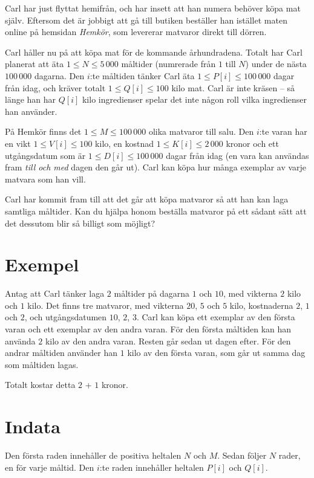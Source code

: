 Carl har just flyttat hemifrån, och har insett att han numera behöver köpa mat själv.
Eftersom det är jobbigt att gå till butiken beställer han istället maten online på hemsidan \emph{Hemkör}, som levererar matvaror direkt till dörren.

Carl håller nu på att köpa mat för de kommande århundradena.
Totalt har Carl planerat att äta $1 \le N \le 5\,000$ måltider (numrerade från $1$ till $N$) under de nästa $100\,000$ dagarna.
Den $i$:te måltiden tänker Carl äta $1 \le P[i] \le 100\,000$ dagar från idag, och kräver totalt $1 \le Q[i] \le 100$ kilo mat.
Carl är inte kräsen -- så länge han har $Q[i]$ kilo ingredienser spelar det inte någon roll vilka ingredienser han använder.

På Hemkör finns det $1 \le M \le 100\,000$ olika matvaror till salu.
Den $i$:te varan har en vikt $1 \le V[i] \le 100$ kilo, en kostnad $1 \le K[i] \le 2\,000$ kronor och ett utgångsdatum som är $1 \le D[i] \le 100\,000$ dagar från idag (en vara kan användas fram \emph{till och med} dagen den går ut).
Carl kan köpa hur många exemplar av varje matvara som han vill.

Carl har kommit fram till att det går att köpa matvaror så att han kan laga samtliga måltider.
Kan du hjälpa honom beställa matvaror på ett sådant sätt att det dessutom blir så billigt som möjligt?


\section*{Exempel}
Antag att Carl tänker laga $2$ måltider på dagarna $1$ och $10$, med vikterna $2$ kilo och $1$ kilo.
Det finns tre matvaror, med vikterna $20$, $5$ och $5$ kilo, kostnaderna $2$, $1$ och $2$, och utgångsdatumen $10$, $2$, $3$.
Carl kan köpa ett exemplar av den första varan och ett exemplar av den andra varan.
För den första måltiden kan han använda $2$ kilo av den andra varan.
Resten går sedan ut dagen efter.
För den andrar måltiden använder han $1$ kilo av den första varan, som går ut samma dag som måltiden lagas.

Totalt kostar detta $2$ + $1$ kronor.


\section*{Indata}
Den första raden innehåller de positiva heltalen $N$ och $M$.
Sedan följer $N$ rader, en för varje måltid.
Den $i$:te raden innehåller heltalen $P[i]$ och $Q[i]$.

